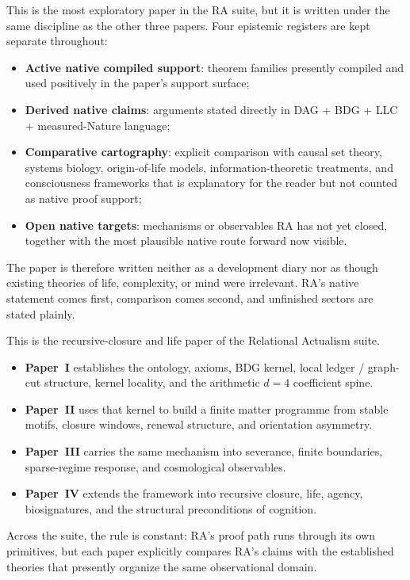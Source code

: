 \documentclass[11pt]{article}
\begin{document}
\begin{tcolorbox}[title=Epistemic Status of This Paper,colback=gray!5,colframe=gray!60]
This is the most exploratory paper in the RA suite, but it is written under the same discipline as the other three papers. Four epistemic registers are kept separate throughout:
\begin{itemize}[nosep]
    \item \textbf{Active native compiled support}: theorem families presently compiled and used positively in the paper's support surface;
    \item \textbf{Derived native claims}: arguments stated directly in DAG + BDG + LLC + measured-Nature language;
    \item \textbf{Comparative cartography}: explicit comparison with causal set theory, systems biology, origin-of-life models, information-theoretic treatments, and consciousness frameworks that is explanatory for the reader but not counted as native proof support;
    \item \textbf{Open native targets}: mechanisms or observables RA has not yet closed, together with the most plausible native route forward now visible.
\end{itemize}
The paper is therefore written neither as a development diary nor as though existing theories of life, complexity, or mind were irrelevant. RA's native statement comes first, comparison comes second, and unfinished sectors are stated plainly.
\end{tcolorbox}

\begin{tcolorbox}[title=Place of This Paper in the RA Suite,colback=gray!5,colframe=gray!60]
This is the recursive-closure and life paper of the Relational Actualism suite.
\begin{itemize}[nosep]
    \item \textbf{Paper~I} establishes the ontology, axioms, BDG kernel, local ledger / graph-cut structure, kernel locality, and the arithmetic $d=4$ coefficient spine.
    \item \textbf{Paper~II} uses that kernel to build a finite matter programme from stable motifs, closure windows, renewal structure, and orientation asymmetry.
    \item \textbf{Paper~III} carries the same mechanism into severance, finite boundaries, sparse-regime response, and cosmological observables.
    \item \textbf{Paper~IV} extends the framework into recursive closure, life, agency, biosignatures, and the structural preconditions of cognition.
\end{itemize}
Across the suite, the rule is constant: RA's proof path runs through its own primitives, but each paper explicitly compares RA's claims with the established theories that presently organize the same observational domain.
\end{tcolorbox}
\end{document}
